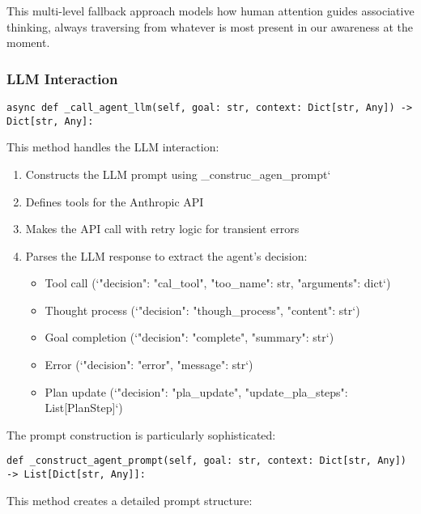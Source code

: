 \documentclass[12pt,a4paper]{article}
\begin{document}
This multi-level fallback approach models how human attention guides associative thinking, always traversing from whatever is most present in our awareness at the moment.

\subsubsection*{LLM Interaction}
\begin{pageablecode}
\begin{verbatim}
async def _call_agent_llm(self, goal: str, context: Dict[str, Any]) -> Dict[str, Any]:
\end{verbatim}
\end{pageablecode}
This method handles the LLM interaction:

\begin{enumerate}[label=\arabic*.]
    \item Constructs the LLM prompt using \1\_construc\1\_agen\1\_prompt`
    \item Defines tools for the Anthropic API
    \item Makes the API call with retry logic for transient errors
    \item Parses the LLM response to extract the agent's decision:
    \begin{itemize}
        \item Tool call (`"decision": "cal\1\_tool", "too\1\_name": str, "arguments": dict`)
        \item Thought process (`"decision": "though\1\_process", "content": str`)
        \item Goal completion (`"decision": "complete", "summary": str`)
        \item Error (`"decision": "error", "message": str`)
        \item Plan update (`"decision": "pla\1\_update", "update\1\_pla\1\_steps": List[PlanStep]`)
    \end{itemize}
\end{enumerate}

The prompt construction is particularly sophisticated:
\begin{pageablecode}
\begin{verbatim}
def _construct_agent_prompt(self, goal: str, context: Dict[str, Any]) -> List[Dict[str, Any]]:
\end{verbatim}
\end{pageablecode}
This method creates a detailed prompt structure:
\end{document}
